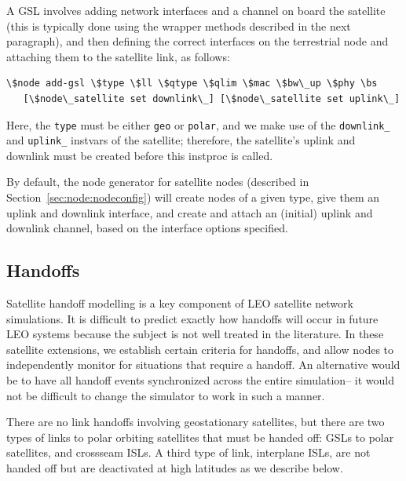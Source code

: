 A GSL involves adding network interfaces and a channel on board the
satellite (this is typically done using the wrapper methods described
in the next paragraph), and then defining the correct interfaces on
the terrestrial node and attaching them to the satellite link, as 
follows:
\begin{verbatim}
\$node add-gsl \$type \$ll \$qtype \$qlim \$mac \$bw\_up \$phy \bs
   [\$node\_satellite set downlink\_] [\$node\_satellite set uplink\_]
\end{verbatim}
Here, the {\tt type} must be either {\tt geo} or {\tt polar}, 
and we make use
of the {\tt downlink\_} and {\tt uplink\_} instvars of the satellite;
therefore, the satellite's uplink and downlink must be created before
this instproc is called.

By default, the node generator for satellite nodes (described in
Section~\ref{sec:node:nodeconfig}) will create nodes of a 
given type, give them an uplink and
downlink interface, and create and attach an (initial) uplink and downlink
channel, based on the interface options specified.



\subsection{Handoffs }
\label{sec:satellite/usage/handoffs}

Satellite handoff modelling is a key component of LEO satellite network 
simulations.  It is difficult to predict exactly how handoffs will occur
in future LEO systems because the subject is not well treated in the
literature.  In these satellite extensions, we establish certain criteria for 
handoffs, and allow nodes to independently monitor for situations that 
require a handoff.  An alternative would be to have all handoff events
synchronized across the entire simulation-- it would not be difficult to 
change the simulator to work in such a manner.

There are no link handoffs involving geostationary satellites, but there 
are two types of links to polar orbiting satellites
that must be handed off:  GSLs to polar satellites, and crossseam ISLs.  
A third type of link, interplane ISLs, are not handed off but are deactivated
at high latitudes as we describe below.


